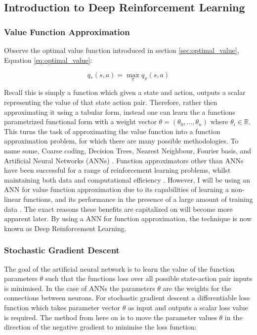 \documentclass[../dissertation.tex]{subfiles}
\begin{document}
\subsection{Introduction to Deep Reinforcement Learning}

\subsubsection{Value Function Approximation}
Observe the optimal value function introduced in section \ref{sec:optimal_value}, Equation \ref{eq:optimal_value}:

$$ q_*(s,a) = \max_\pi q_\pi(s,a)$$

Recall this is simply a function which given a state and action, outputs a scalar representing the value of that state action pair. Therefore, rather then approximating it using a tabular form, instead one can learn the a functions parametrized functional form with a weight vector $\theta = (\theta_0, ..., \theta_n) \text{ where } \theta_i \in \mathbb{R}$. This turns the task of approximating the value function into a function approximation problem, for which there are many possible methodologies. To name some, Coarse coding, Decision Trees, Nearest Neighbour, Fourier basis, and Artificial Neural Networks (ANNs) \cite{sutton2011reinforcement}. Function approximators other than ANNs have been successful for a range of reinforcement learning problems, whilst maintaining both data and computational efficiency \cite{sutton1996generalization, konidaris2011value, uther1998tree}. However, I will be using an ANN for value function approximation due to its capabilities of learning a non-linear functions, and its performance in the presence of a large amount of training data \cite{lecun2015deep}. The exact reasons these benefits are capitalized on will become more apparent later. By using a ANN for function approximation, the technique is now known as Deep Reinforcement Learning.

\subsubsection{Stochastic Gradient Descent}
The goal of the artificial neural network is to learn the value of the function parameters $\theta$ such that the functions loss over all possible state-action pair inputs is minimised. In the case of ANNs the parameters $\theta$ are the weights for the connections between neurons. For stochastic gradient descent a differentiable loss function which takes parameter vector $\theta$ as input and outputs a scalar loss value is required. The method from here on is to move the parameter values $\theta$ in the direction of the negative gradient to minimise the loss function:
\end{document}
